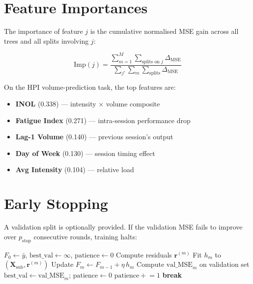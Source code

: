 \documentclass[12pt,a4paper]{report}
\newcommand{\mat}[1]{\mathbf{#1}}
\newcommand{\vect}[1]{\bm{#1}}
\theoremstyle{definition}
\begin{document}
\section{Feature Importances}

The importance of feature $j$ is the cumulative normalised MSE gain across all
trees and all splits involving $j$:

\[
  \text{Imp}(j) = \frac{\sum_{m=1}^{M}\sum_{\text{splits on } j} \Delta_{\text{MSE}}}
                        {\sum_{j'} \sum_m \sum_{\text{splits}} \Delta_{\text{MSE}}}
\]

On the HPI volume-prediction task, the top features are:
\begin{itemize}
  \item \textbf{INOL} (0.338) — intensity × volume composite
  \item \textbf{Fatigue Index} (0.271) — intra-session performance drop
  \item \textbf{Lag-1 Volume} (0.140) — previous session's output
  \item \textbf{Day of Week} (0.130) — session timing effect
  \item \textbf{Avg Intensity} (0.104) — relative load
\end{itemize}

\section{Early Stopping}

A validation split is optionally provided. If the validation MSE fails to
improve over $p_{\text{stop}}$ consecutive rounds, training halts:

\begin{algorithm}[H]
\caption{GBDT with Early Stopping}
\begin{algorithmic}[1]
\State $F_0 \gets \bar{y}$, $\text{best\_val} \gets \infty$, $\text{patience} \gets 0$
  \State Compute residuals $\vect{r}^{(m)}$
  \State Fit $h_m$ to $(\mat{X}_{\text{sub}}, \vect{r}^{(m)})$
  \State Update $F_m \gets F_{m-1} + \eta\, h_m$
  \State Compute $\text{val\_MSE}_m$ on validation set
    \State $\text{best\_val} \gets \text{val\_MSE}_m$;\; $\text{patience} \gets 0$
  \Else
    \State $\text{patience} \mathrel{+}= 1$
     \textbf{break} \EndIf
  \EndIf
\EndFor
\end{algorithmic}
\end{algorithm}
\end{document}
